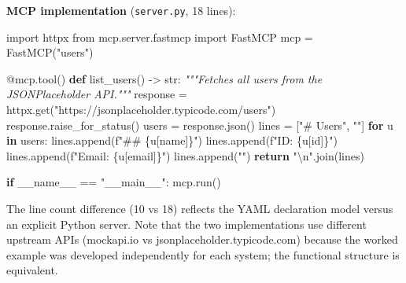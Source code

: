 \documentclass[
  11pt,
]{article}
\newenvironment{Shaded}{}{}
\newcommand{\AttributeTok}[1]{\textcolor[rgb]{0.49,0.56,0.16}{#1}}
\newcommand{\BuiltInTok}[1]{#1}
\newcommand{\CharTok}[1]{\textcolor[rgb]{0.25,0.44,0.63}{#1}}
\newcommand{\CommentTok}[1]{\textcolor[rgb]{0.38,0.63,0.69}{\textit{#1}}}
\newcommand{\ControlFlowTok}[1]{\textcolor[rgb]{0.00,0.44,0.13}{\textbf{#1}}}
\newcommand{\ImportTok}[1]{#1}
\newcommand{\KeywordTok}[1]{\textcolor[rgb]{0.00,0.44,0.13}{\textbf{#1}}}
\newcommand{\NormalTok}[1]{#1}
\newcommand{\OperatorTok}[1]{\textcolor[rgb]{0.40,0.40,0.40}{#1}}
\newcommand{\SpecialCharTok}[1]{\textcolor[rgb]{0.25,0.44,0.63}{#1}}
\newcommand{\SpecialStringTok}[1]{\textcolor[rgb]{0.73,0.40,0.53}{#1}}
\newcommand{\StringTok}[1]{\textcolor[rgb]{0.25,0.44,0.63}{#1}}
\newcommand{\VariableTok}[1]{\textcolor[rgb]{0.10,0.09,0.49}{#1}}
\begin{document}
\textbf{MCP implementation} (\texttt{server.py}, 18 lines):

\begin{Shaded}
\begin{Highlighting}[]
\ImportTok{import}\NormalTok{ httpx}
\ImportTok{from}\NormalTok{ mcp.server.fastmcp }\ImportTok{import}\NormalTok{ FastMCP}
\NormalTok{mcp }\OperatorTok{=}\NormalTok{ FastMCP(}\StringTok{"users"}\NormalTok{)}

\AttributeTok{@mcp.tool}\NormalTok{()}
\KeywordTok{def}\NormalTok{ list\_users() }\OperatorTok{{-}\textgreater{}} \BuiltInTok{str}\NormalTok{:}
    \CommentTok{"""Fetches all users from the JSONPlaceholder API."""}
\NormalTok{    response }\OperatorTok{=}\NormalTok{ httpx.get(}\StringTok{"https://jsonplaceholder.typicode.com/users"}\NormalTok{)}
\NormalTok{    response.raise\_for\_status()}
\NormalTok{    users }\OperatorTok{=}\NormalTok{ response.json()}
\NormalTok{    lines }\OperatorTok{=}\NormalTok{ [}\StringTok{"\# Users"}\NormalTok{, }\StringTok{""}\NormalTok{]}
    \ControlFlowTok{for}\NormalTok{ u }\KeywordTok{in}\NormalTok{ users:}
\NormalTok{        lines.append(}\SpecialStringTok{f"\#\# }\SpecialCharTok{\{u}\NormalTok{[}\StringTok{\textquotesingle{}name\textquotesingle{}}\NormalTok{]}\SpecialCharTok{\}}\SpecialStringTok{"}\NormalTok{)}
\NormalTok{        lines.append(}\SpecialStringTok{f"ID: }\SpecialCharTok{\{u}\NormalTok{[}\StringTok{\textquotesingle{}id\textquotesingle{}}\NormalTok{]}\SpecialCharTok{\}}\SpecialStringTok{"}\NormalTok{)}
\NormalTok{        lines.append(}\SpecialStringTok{f"Email: }\SpecialCharTok{\{u}\NormalTok{[}\StringTok{\textquotesingle{}email\textquotesingle{}}\NormalTok{]}\SpecialCharTok{\}}\SpecialStringTok{"}\NormalTok{)}
\NormalTok{        lines.append(}\StringTok{""}\NormalTok{)}
    \ControlFlowTok{return} \StringTok{"}\CharTok{\textbackslash{}n}\StringTok{"}\NormalTok{.join(lines)}

\ControlFlowTok{if} \VariableTok{\_\_name\_\_} \OperatorTok{==} \StringTok{"\_\_main\_\_"}\NormalTok{:}
\NormalTok{    mcp.run()}
\end{Highlighting}
\end{Shaded}

The line count difference (10 vs 18) reflects the YAML declaration model
versus an explicit Python server. Note that the two implementations use
different upstream APIs (mockapi.io vs jsonplaceholder.typicode.com)
because the worked example was developed independently for each system;
the functional structure is equivalent.
\end{document}
